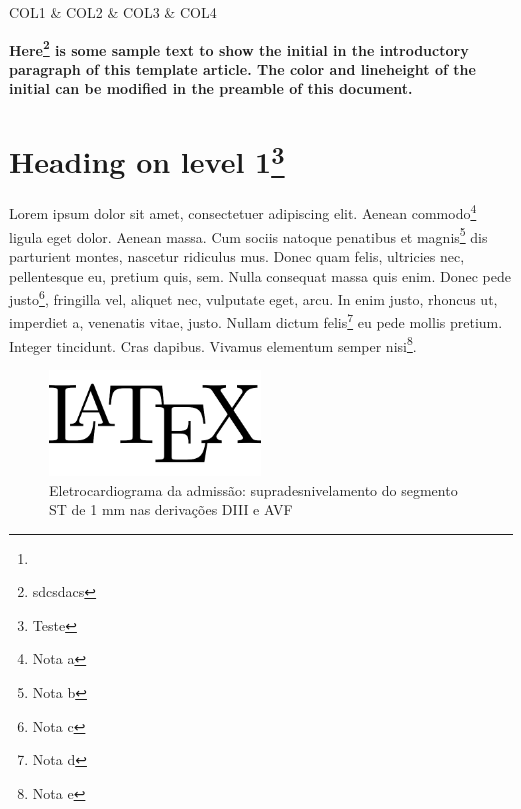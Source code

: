 
\begin{abstract}
  \testechines{}  וּבְכָל-נַפְשְׁךָ, וּבְכָל-מְאֹדֶֽךָ. וְהָיוּ הַדְּבָרִים הָאֵלֶּה, אֲשֶׁר Cirero dixit Мы
  работаем в той отрасли, где зависимость от импортных комплектующих уже почти
  как два десятилетия назад достигла своего предельного
  значения.\footnote{\lipsum[2]}\lipsum[1]
\end{abstract}


{
}
{ \FL
	COL1 & COL2 & COL3 & COL4 \NN
}

\textbf{Here\footnote{sdcsdacs} is some sample text to show the initial in the introductory paragraph of this template article. The color and lineheight of the initial can be modified in the preamble of this document.}

\section{Heading on level 1\footnote{Teste}}
Lorem ipsum dolor sit amet, consectetuer adipiscing elit. Aenean commodo\footnote{Nota a} ligula
eget dolor. Aenean massa. Cum sociis natoque penatibus et magnis\footnote{Nota b} dis parturient
montes, nascetur ridiculus mus. Donec quam felis, ultricies nec, pellentesque
eu, pretium quis, sem. Nulla consequat massa quis enim. Donec pede justo\footnote{Nota c},
fringilla vel, aliquet nec, vulputate eget, arcu. In enim justo, rhoncus ut,
imperdiet a, venenatis vitae, justo. Nullam dictum felis\footnote{Nota d} eu pede mollis
pretium. Integer tincidunt. Cras dapibus. Vivamus elementum semper nisi\footnote{Nota e}. 

\par
\begin{figure}[h]
	\centering
	\includegraphics[width=0.5\textwidth]{temp.png}
	\caption{Eletrocardiograma da admissão: supradesnivelamento do segmento ST de 1 mm nas derivações DIII e AVF}
	\label{Figura 1 xxx}
\end{figure}

